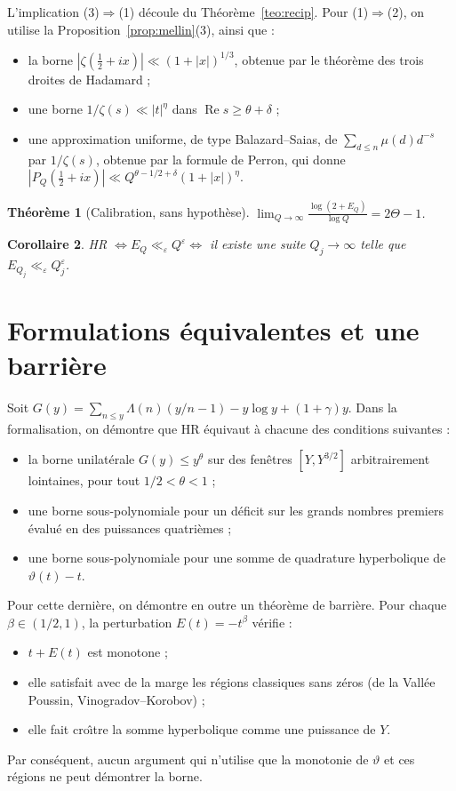 \documentclass[11pt,a4paper]{amsart}
\newtheorem{teorema}{Th\'eor\`eme}
\newtheorem{corolario}[teorema]{Corollaire}
\theoremstyle{definition}
\theoremstyle{remark}
\renewcommand{\Re}{\operatorname{Re}}
\begin{document}
L'implication (3)$\Rightarrow$(1) d\'ecoule du Th\'eor\`eme~\ref{teo:recip}. Pour (1)$\Rightarrow$(2), on utilise la Proposition~\ref{prop:mellin}(3), ainsi que :
\begin{itemize}
\item la borne $|\zeta(\tfrac12+ix)|\ll(1+|x|)^{1/3}$, obtenue par le th\'eor\`eme des trois droites de Hadamard ;
\item une borne $1/\zeta(s)\ll|t|^\eta$ dans $\Re s\ge\theta+\delta$ ;
\item une approximation uniforme, de type Balazard--Saias, de $\sum_{d\le n}\mu(d)d^{-s}$ par $1/\zeta(s)$, obtenue par la formule de Perron, qui donne $|P_Q(\tfrac12+ix)|\ll Q^{\theta-1/2+\delta}(1+|x|)^\eta$.
\end{itemize}

\begin{teorema}[Calibration, sans hypoth\`ese]\label{teo:calibracion}
$\displaystyle\lim_{Q\to\infty}\frac{\log(2+E_Q)}{\log Q}=2\Theta-1$.
\end{teorema}

\begin{corolario}
HR $\iff E_Q\ll_\varepsilon Q^\varepsilon\iff$ il existe une suite $Q_j\to\infty$ telle que $E_{Q_j}\ll_\varepsilon Q_j^\varepsilon$.
\end{corolario}

\section{Formulations \'equivalentes et une barri\`ere}\label{sec:equiv}

Soit $G(y)=\sum_{n\le y}\Lambda(n)(y/n-1)-y\log y+(1+\gamma)y$. Dans la formalisation, on d\'emontre que HR \'equivaut \`a chacune des conditions suivantes :
\begin{itemize}
\item la borne unilat\'erale $G(y)\le y^\theta$ sur des fen\^etres $[Y,Y^{3/2}]$ arbitrairement lointaines, pour tout $1/2<\theta<1$ ;
\item une borne sous-polynomiale pour un d\'eficit sur les grands nombres premiers \'evalu\'e en des puissances quatri\`emes ;
\item une borne sous-polynomiale pour une somme de quadrature hyperbolique de $\vartheta(t)-t$.
\end{itemize}
Pour cette derni\`ere, on d\'emontre en outre un th\'eor\`eme de barri\`ere. Pour chaque $\beta\in(1/2,1)$, la perturbation $E(t)=-t^\beta$ v\'erifie :
\begin{itemize}
\item $t+E(t)$ est monotone ;
\item elle satisfait avec de la marge les r\'egions classiques sans z\'eros (de la Vall\'ee Poussin, Vinogradov--Korobov) ;
\item elle fait cro\^{\i}tre la somme hyperbolique comme une puissance de $Y$.
\end{itemize}
Par cons\'equent, aucun argument qui n'utilise que la monotonie de $\vartheta$ et ces r\'egions ne peut d\'emontrer la borne.
\end{document}
